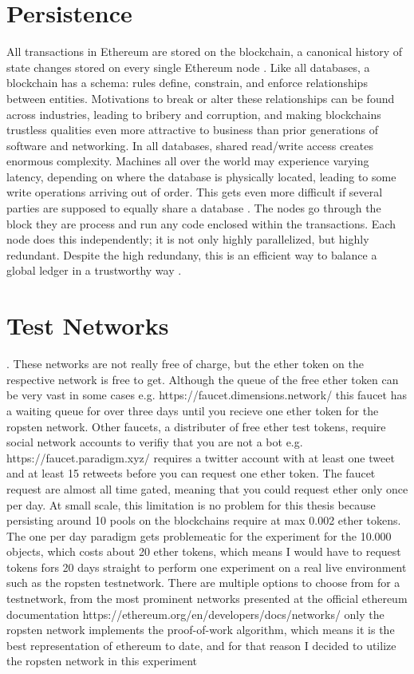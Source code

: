 \section{Persistence}
All transactions in Ethereum are stored on the blockchain, a canonical history of state changes stored on every single Ethereum node \cite[12]{dannen2017introducing}.
Like all databases, a blockchain has a schema: rules define, constrain, and enforce relationships between entities. Motivations to break or alter these relationships can be found across industries, leading to bribery and corruption, and making blockchains trustless qualities even more attractive to business than prior generations of software and networking. In all databases, shared read/write access creates enormous complexity. Machines all over the world may experience varying latency, depending on where the database is physically located, leading to some write operations arriving out of order. This gets even more difficult if several parties are supposed to equally share a database \cite[20]{dannen2017introducing}. 
The nodes go through the block they are process and run any code enclosed within the transactions. Each node does this independently; it is not only highly parallelized, but highly redundant. Despite the high redundany, this is an efficient way to balance a global ledger in a trustworthy way \cite[50]{dannen2017introducing}.

\section{Test Networks}. 
These networks are not really free of charge, but the ether token on the respective network is free to get. Although the queue of the free ether token can be very vast in some cases e.g. https://faucet.dimensions.network/ this faucet has a waiting queue for over three days until you recieve one ether token for the ropsten network. Other faucets, a distributer of free ether test tokens, require social network accounts to verifiy that you are not a bot e.g. https://faucet.paradigm.xyz/ requires a twitter account with at least one tweet and at least 15 retweets before you can request one ether token. The faucet request are almost all time gated, meaning that you could request ether only once per day. At small scale, this limitation is no problem for this thesis because persisting around 10 pools on the blockchains require at max 0.002 ether tokens. The one per day paradigm gets problemeatic for the experiment for the 10.000 objects, which costs about 20 ether tokens, which means I would have to request tokens fors 20 days straight to perform one experiment on a real live environment such as the ropsten testnetwork. 
There are multiple options to choose from for a testnetwork, from the most prominent networks presented at the official ethereum documentation https://ethereum.org/en/developers/docs/networks/ only the ropsten network implements the proof-of-work algorithm, which means it is the best representation of ethereum to date, and for that reason I decided to utilize the ropsten network in this experiment
